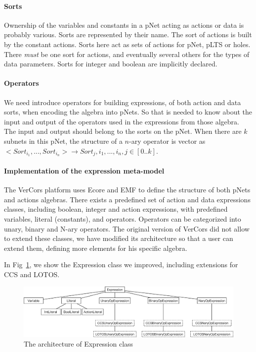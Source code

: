 \documentclass{lncs/llncs}
\begin{document}
\paragraph{Sorts}
Ownership of the variables and constants in a pNet acting as actions
or data is probably various. Sorts are represented by their name. The
sort of actions is built by the constant actions. Sorts here act as
sets of actions for pNet, pLTS or 
holes. There \emph{must} be one sort for actions, and eventually
several others for the types of data parameters. Sorts for integer
and boolean are implicitly declared. 

\paragraph{Operators}
We need introduce operators for building expressions, of both action
and data sorts, when encoding the 
algebra into pNets. So that is needed to know about the input and
output of the operators used in the expressions from those
algebra. The input and output should belong to the sorts on the
pNet. When there are $k$ subnets in this pNet, the structure of a
$n$-ary operator is vector as $< Sort_{i_1}, ... , Sort_{i_n} >
\rightarrow Sort_j , i_1 , ... , i_n, j \in [0..k] $.


\paragraph{Implementation of the expression meta-model}
The VerCors platform uses Ecore and EMF to define the structure of
both pNets and actions algebras. There exists a predefined set of
action and data expressions classes, including boolean, integer and
action expressions, with predefined variables, literal (constants),
and operators. Operators can be categorized into unary, binary and
N-ary operators.
The original version of VerCors did not allow to extend these classes,
we have modified its architecture so that a user can extend them,
defining more elements for his specific algebra.

In Fig~\ref{schema:expression-pnets}, we show the Expression class we
improved, including extensions for CCS and LOTOS.

\begin{figure}[t]
  \includegraphics[width=\linewidth]{XFIG/Expression}
  \caption{The architecture of Expression class}  \label{schema:expression-pnets}
\end{figure}
\end{document}
